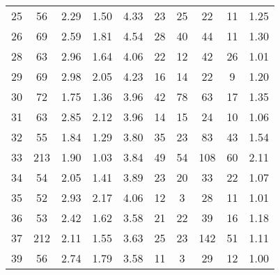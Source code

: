 \begin{tabular}{lccccccccc}
25 &       56 &           2.29 &           1.50 &          4.33 &              23 &              25 &                    22 &                       11 &       1.25 \\
26 &       69 &           2.59 &           1.81 &          4.54 &              28 &              40 &                    44 &                       11 &       1.30 \\
28 &       63 &           2.96 &           1.64 &          4.06 &              22 &              12 &                    42 &                       26 &       1.01 \\
29 &       69 &           2.98 &           2.05 &          4.23 &              16 &              14 &                    22 &                        9 &       1.20 \\
30 &       72 &           1.75 &           1.36 &          3.96 &              42 &              78 &                    63 &                       17 &       1.35 \\
31 &       63 &           2.85 &           2.12 &          3.96 &              14 &              15 &                    24 &                       10 &       1.06 \\
32 &       55 &           1.84 &           1.29 &          3.80 &              35 &              23 &                    83 &                       43 &       1.54 \\
33 &      213 &           1.90 &           1.03 &          3.84 &              49 &              54 &                   108 &                       60 &       2.11 \\
34 &       54 &           2.05 &           1.41 &          3.89 &              23 &              20 &                    33 &                       22 &       1.07 \\
35 &       52 &           2.93 &           2.17 &          4.06 &              12 &               3 &                    28 &                       11 &       1.01 \\
36 &       53 &           2.42 &           1.62 &          3.58 &              21 &              22 &                    39 &                       16 &       1.18 \\
37 &      212 &           2.11 &           1.55 &          3.63 &              25 &              23 &                   142 &                       51 &       1.11 \\
39 &       56 &           2.74 &           1.79 &          3.58 &              11 &               3 &                    29 &                       12 &       1.00 \\

\end{tabular}
